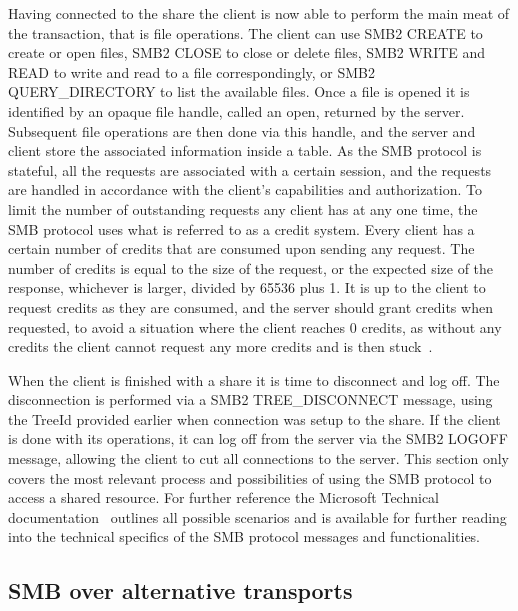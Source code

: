 \documentclass[english, 12pt, a4paper, elec, utf8, a-2b, online]{aaltothesis}
\begin{document}
Having connected to the share the client is now able to perform the main meat of the
transaction, that is file operations. The client can use SMB2 CREATE to create
or open files, SMB2 CLOSE to close or delete files, SMB2 WRITE and READ to write and
read to a file correspondingly, or SMB2 QUERY\_DIRECTORY to list the available files.
Once a file is opened it is identified by an opaque file handle, called an open, returned by the server.
Subsequent file operations are then done via this handle, and the server and client
store the associated information inside a table.
As the SMB protocol is stateful, all the requests are associated with a certain
session, and the requests are handled in accordance with the client's capabilities
and authorization. To limit the number of outstanding requests any client has at
any one time, the SMB protocol uses what is referred to as a credit system. Every
client has a certain number of credits that are consumed upon sending any request.
The number of credits is equal to the size of the request, or the expected size of
the response, whichever is larger, divided by 65536 plus 1. It is up to the client
to request credits as they are consumed, and the server should grant credits when
requested, to avoid a situation where the client reaches 0 credits, as without
any credits the client cannot request any more credits and is then stuck~\cite{smb2_tech}.

When the client is finished with a share it is time to disconnect and log off. The
disconnection is performed via a SMB2 TREE\_DISCONNECT message, using the TreeId
provided earlier when connection was setup to the share. If the client is done with its
operations, it can log off from the server via the SMB2 LOGOFF message, allowing
the client to cut all connections to the server. This section only covers the most
relevant process and possibilities of using the SMB protocol to access a shared resource.
For further reference the Microsoft Technical documentation~\cite{smb2_tech} outlines all possible
scenarios and is available for further reading into the technical specifics of the
SMB protocol messages and functionalities.

\subsection{SMB over alternative transports}
\end{document}
